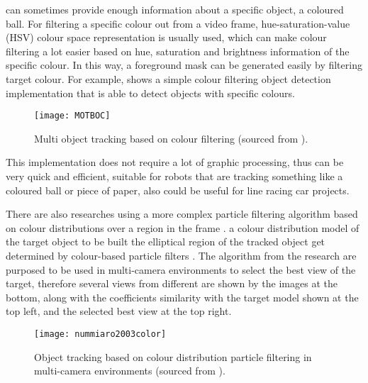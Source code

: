  can sometimes provide enough information about a specific object,  a coloured ball. For filtering a specific colour out from a video frame, hue-saturation-value (HSV) colour space \cite[p.~301]{colourspace} representation is usually used, which can make colour filtering a lot easier based on hue, saturation and brightness information of the specific colour. In this way, a foreground mask can be generated easily by filtering  target colour. For example,  shows a simple colour filtering object detection implementation \cite{MOTBOC.git} that is able to detect objects with specific colours.

\begin{figure}[H]
  \centering
  \texttt{[image: MOTBOC]}
  \caption{Multi object tracking based on colour filtering (sourced from \cite{MOTBOC.git}).}
  \label{Figure:MOTBOC}
\end{figure}

This implementation does not require a lot of graphic processing, thus can be very quick and efficient, suitable for robots that are tracking something like a coloured ball or  piece of paper,  also could be useful for line racing car projects.

There are also researches using a more complex particle filtering algorithm based on colour distributions over a region in the frame \cite{nummiaro2003color} .  a colour distribution model of the target object  to be built the elliptical region of the tracked object get determined by  colour-based particle filters \cite{nummiaro2003adaptive}. The algorithm from the research are purposed to be used in multi-camera environments to select the best view of the target, therefore several views from different  are shown by the images at the bottom, along with the coefficients  similarity with the target model shown at the top left, and the selected best view at the top right.

\begin{figure}[H]
  \centering
  \texttt{[image: nummiaro2003color]}
  \caption{Object tracking based on colour distribution particle filtering in multi-camera environments (sourced from \cite{nummiaro2003color}).}
  \label{Figure:nummiaro2003color}
\end{figure}

